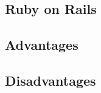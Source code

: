 \subsection{Ruby on Rails}
\label{sect:framework:ror}


\subsection{Advantages}
\label{sect:framwork:advantages}


\subsection{Disadvantages}
\label{sect:framwork:disadvantages}
